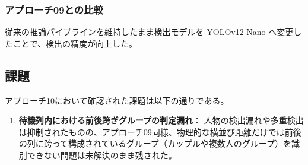 \subsubsection{アプローチ09との比較}
従来の推論パイプラインを維持したまま検出モデルを YOLOv12 Nano へ変更したことで、検出の精度が向上した。

\subsection{課題}
アプローチ10において確認された課題は以下の通りである。

\begin{enumerate}
    \item \textbf{待機列内における前後跨ぎグループの判定漏れ}：
    人物の検出漏れや多重検出は抑制されたものの、アプローチ09同様、物理的な横並び距離だけでは前後の列に跨って構成されているグループ（カップルや複数人のグループ）を識別できない問題は未解決のまま残された。
\end{enumerate}

\clearpage
